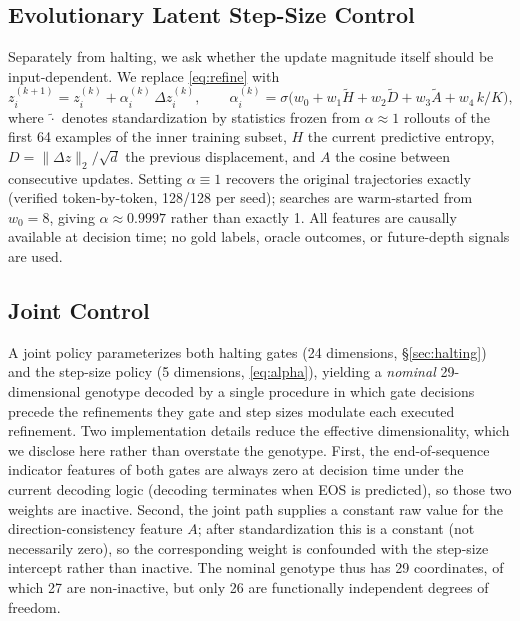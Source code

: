 \documentclass[11pt]{article}
\begin{document}
\subsection{Evolutionary Latent Step-Size Control}
\label{sec:alpha}
Separately from halting, we ask whether the update magnitude itself should be input-dependent. We replace \eqref{eq:refine} with
\begin{equation}
z_i^{(k+1)} = z_i^{(k)} + \alpha_i^{(k)}\,\Delta z_i^{(k)}, \qquad
\alpha_i^{(k)} = \sigma\!\big(w_0 + w_1 \tilde H + w_2 \tilde D + w_3 \tilde A + w_4\, k/K\big),
\label{eq:alpha}
\end{equation}
where $\tilde\cdot$ denotes standardization by statistics frozen from $\alpha{\approx}1$ rollouts of the first 64 examples of the inner training subset, $H$ the current predictive entropy, $D = \lVert\Delta z\rVert_2/\sqrt{d}$ the previous displacement, and $A$ the cosine between consecutive updates. Setting $\alpha \equiv 1$ recovers the original trajectories exactly (verified token-by-token, 128/128 per seed); searches are warm-started from $w_0 = 8$, giving $\alpha \approx 0.9997$ rather than exactly 1. All features are causally available at decision time; no gold labels, oracle outcomes, or future-depth signals are used.

\subsection{Joint Control}
A joint policy parameterizes both halting gates (24 dimensions, \S\ref{sec:halting}) and the step-size policy (5 dimensions, \eqref{eq:alpha}), yielding a \emph{nominal} 29-dimensional genotype decoded by a single procedure in which gate decisions precede the refinements they gate and step sizes modulate each executed refinement. Two implementation details reduce the effective dimensionality, which we disclose here rather than overstate the genotype. First, the end-of-sequence indicator features of both gates are always zero at decision time under the current decoding logic (decoding terminates when EOS is predicted), so those two weights are inactive. Second, the joint path supplies a constant raw value for the direction-consistency feature $A$; after standardization this is a constant (not necessarily zero), so the corresponding weight is confounded with the step-size intercept rather than inactive. The nominal genotype thus has 29 coordinates, of which 27 are non-inactive, but only 26 are functionally independent degrees of freedom.
\end{document}

